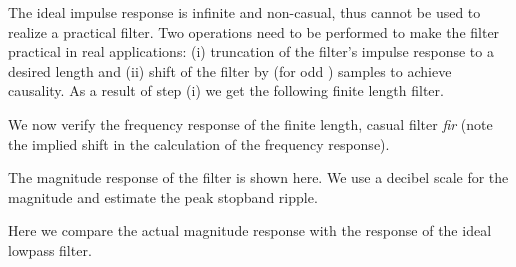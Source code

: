 \documentclass{article}
\begin{document}
\begin{CellGroup}
\begin{CellGroup}
\end{CellGroup}
The ideal impulse response is infinite and non-casual, thus cannot be used to realize a practical filter. Two operations need to be performed to
make the filter practical in real applications: (i) truncation of the filter's impulse response to a desired length  and (ii) shift
of the filter by  (for odd ) samples to achieve causality. As a result of step (i) we get the following
finite length filter.



\begin{CellGroup}

\end{CellGroup}
We now verify the frequency response of the finite length, casual filter {\itshape fir }(note the implied shift in the calculation of the frequency
response).



The magnitude response of the filter is shown here. We use a decibel scale for the magnitude and estimate the peak stopband ripple.

\begin{CellGroup}

\end{CellGroup}
Here we compare the actual magnitude response with the response of the ideal lowpass filter.

\begin{CellGroup}


\end{CellGroup}
\end{CellGroup}
\end{document}
